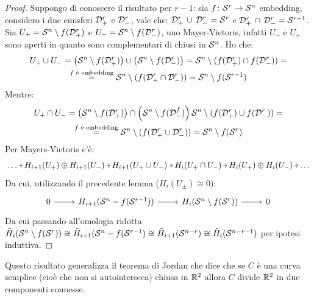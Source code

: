 \begin{proof}
  Suppongo di conoscere il risultato per $ r - 1 $: sia
  $ f \colon \mathcal{S}^{r} \to \mathcal{S}^{n} $ embedding, considero i due emisferi
  $ \mathcal{D}^{r}_+ $ e $ \mathcal{D}^{r}_- $, vale che:
  $ \mathcal{D}^{r}_+ \, \cup \, \mathcal{D}^{r}_- = \mathcal{S}^{r} $ e
  $ \mathcal{D}^{r}_+ \, \cap \, \mathcal{D}^{r}_- = \mathcal{S}^{r-1} $. Sia
  $ U_+ = \mathcal{S}^{n} \setminus f(\mathcal{D}^{r}_+) $ e
  $ U_- = \mathcal{S}^{n} \setminus f(\mathcal{D}^{r}_-) $, uno Mayer-Vietoris, infatti $ U_- $ e
  $ U_+ $ sono aperti in quanto sono complementari di chiusi in $ \mathcal{S}^{n} $.
  Ho che:
  \begin{gather*}
    U_+ \cup U_- = \left(\mathcal{S}^{n} \setminus f(\mathcal{D}^{r}_+) \right) \cup \left( \mathcal{S}^{n} \setminus f(\mathcal{D}^{r}_-) \right) =
    \mathcal{S}^{n} \setminus (f(\mathcal{D}^{r}_+) \cap  f(\mathcal{D}^{r}_-)) = \\
   \overset{\text{$ f $ è embedding}} {=}  \mathcal{S}^{n} \setminus (f(\mathcal{D}^{r}_+  \cap  \mathcal{D}^{r}_-)) = \mathcal{S}^{n} \setminus f(\mathcal{S}^{r-1})
  \end{gather*}
  Mentre:
  \begin{gather*}
    U_+ \cap U_- = \left(\mathcal{S}^{n} \setminus f(\mathcal{D}^{r}_+) \right) \cap \left(\mathcal{S}^{n} \setminus f(\mathcal{D}^{f}_-) \right)
    \mathcal{S}^{n} \setminus (f(\mathcal{D}^{r}_+) \cup  f(\mathcal{D}^{r}_-)) = \\
    \overset{\text{$ f $ è embedding}} {=}  \mathcal{S}^{n} \setminus (f(\mathcal{D}^{r}_+  \cup  \mathcal{D}^{r}_-)) = \mathcal{S}^{n} \setminus f(\mathcal{S}^{r})
  \end{gather*}
  Per Mayers-Vietoris c'è:
  \[
    \begin{tikzcd}[nodes={column sep = 5pt, inner sep = 2pt}]
      \dots \rar & H_{i+1}(U_+) \oplus H_{i+1}(U_-) \rar & H_{i+1}(U_+ \cup U_-) \rar & H_i(U_+ \cap U_-) \rar & H_i (U_+) \oplus H_i(U_-)
      \rar & \dots
    \end{tikzcd}
  \]
  Da cui, utilizzando il precedente lemma ($ H_i(U_\pm) \cong 0 $):
  \[
    \begin{tikzcd}
      0 \rar & H_{i+1}(\Sph{n} - f(\Sph{r-1})) \rar & H_i(\Sph{n} \setminus f(\Sph{r})) \rar & 0
    \end{tikzcd}
  \]
  Da cui passando all'omologia ridotta
  $ \tilde{H}_i(\mathcal{S}^{n} \setminus f(\mathcal{S}^{r})) \cong \tilde{H}_{i+1}(\mathcal{S}^{n} - f(\mathcal{S}^{r-1}) \cong \tilde{H}_{i+1}(\mathcal{S}^{n-r}) \cong \tilde{H}_i(\mathcal{S}^{n-r-1}) $
  per ipotesi induttiva.
\end{proof}

Questo risultato generalizza il teorema di Jordan che
dice che se $ C $ è una curva semplice (cioè che non si autointerseca) chiusa in
$ \mathbb{R}^{2} $ allora $ C $ divide $ \mathbb{R}^{2} $ in due componenti connesse.

